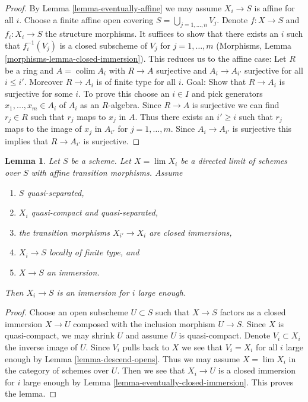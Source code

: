 \documentclass{stacks-project}
\theoremstyle{plain}
\newtheorem{lemma}[subsection]{Lemma}
\theoremstyle{definition}
\theoremstyle{remark}
\numberwithin{equation}{subsection}
\def\lim{\mathop{\mathrm{lim}}\nolimits}
\def\colim{\mathop{\mathrm{colim}}\nolimits}
\begin{document}
\begin{proof}
By Lemma \ref{lemma-eventually-affine}
we may assume $X_i \to S$ is affine for all $i$.
Choose a finite affine open covering $S = \bigcup_{j = 1, \ldots, n} V_j$.
Denote $f : X \to S$ and $f_i : X_i \to S$ the structure morphisms.
It suffices to show that there exists an $i$ such that
$f_i^{-1}(V_j)$ is a closed subscheme of $V_j$ for $j = 1, \ldots, m$
(Morphisms, Lemma \ref{morphisms-lemma-closed-immersion}).
This reduces us to the affine case: Let $R$ be a ring and
$A = \colim A_i$ with $R \to A$ surjective and $A_i \to A_{i'}$
surjective for all $i \leq i'$. Moreover $R \to A_i$ is of finite type
for all $i$. Goal: Show that $R \to A_i$ is surjective for some $i$.
To prove this choose an $i \in I$ and pick generators
$x_1, \ldots, x_m \in A_i$ of $A_i$ as an $R$-algebra.
Since $R \to A$ is surjective we can find
$r_j \in R$ such that $r_j$ maps to $x_j$ in $A$.
Thus there exists an $i' \geq i$ such that $r_j$ maps to the image
of $x_j$ in $A_{i'}$ for $j = 1, \ldots, m$. Since $A_i \to A_{i'}$
is surjective this implies that $R \to A_{i'}$ is surjective.
\end{proof}

\begin{lemma}
\label{lemma-eventually-immersion}
Let $S$ be a scheme. Let $X = \lim X_i$ be a directed limit of schemes
over $S$ with affine transition morphisms. Assume
\begin{enumerate}
\item $S$ quasi-separated,
\item $X_i$ quasi-compact and quasi-separated,
\item the transition morphisms $X_{i'} \to X_i$ are closed immersions,
\item $X_i \to S$ locally of finite type, and
\item $X \to S$ an immersion.
\end{enumerate}
Then $X_i \to S$ is an immersion for $i$ large enough.
\end{lemma}

\begin{proof}
Choose an open subscheme $U \subset S$ such that $X \to S$ factors
as a closed immersion $X \to U$ composed with the inclusion morphism
$U \to S$. Since $X$ is quasi-compact, we may shrink $U$ and assume
$U$ is quasi-compact. Denote $V_i \subset X_i$ the inverse image of $U$.
Since $V_i$ pulls back to $X$ we see that $V_i = X_i$ for all $i$
large enough by Lemma \ref{lemma-descend-opens}. Thus we may
assume $X = \lim X_i$ in the category of schemes over $U$.
Then we see that $X_i \to U$ is a closed immersion for $i$
large enough by Lemma \ref{lemma-eventually-closed-immersion}.
This proves the lemma.
\end{proof}
\end{document}
